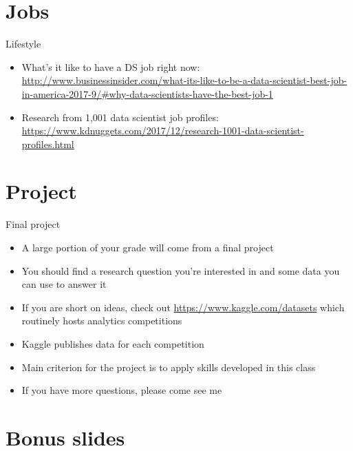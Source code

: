 \documentclass[english,aspectratio=169,12pt,xcolor=dvipsnames]{beamer}
\begin{document}
\section{Jobs}
\begin{frame}{Lifestyle}
\begin{itemize}
\item What's it like to have a DS job right now: \url{http://www.businessinsider.com/what-its-like-to-be-a-data-scientist-best-job-in-america-2017-9/\#why-data-scientists-have-the-best-job-1}
\item Research from 1,001 data scientist job profiles: \url{https://www.kdnuggets.com/2017/12/research-1001-data-scientist-profiles.html}
\end{itemize}
\end{frame}

\section{Project}
\begin{frame}{Final project}
\begin{itemize}
\item A large portion of your grade will come from a final project
\item You should find a research question you're interested in and some data you can use to answer it
\item If you are short on ideas, check out \url{https://www.kaggle.com/datasets} which routinely hosts analytics competitions
\item Kaggle publishes data for each competition
\item Main criterion for the project is to apply skills developed in this class
\item If you have more questions, please come see me
\end{itemize}
\end{frame}

\appendix

\section*{Bonus slides}

%
%
\end{document}
